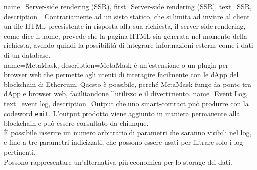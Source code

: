 {
    name={Server-side rendering (SSR)},
    first={Server-side rendering (SSR)},
    text={SSR},
    description={
            Contrariamente ad un sisto statico, che si limita ad inviare al client un file HTML preesistente in risposta alla sua richiesta,
            il server side rendering, come dice il nome, prevede che la pagina HTML sia generata nel momento della richiesta, avendo quindi la possibilità di integrare informazioni esterne come i dati di un database. \\
        }
}
{
    name={MetaMask},
    description={MetaMask è un'estensione o un plugin per browser web che permette agli utenti di interagire facilmente con le dApp del blockchain di Ethereum.
            Questo è possibile, perché MetaMask funge da ponte tra dApp e browser web, facilitandone l'utilizzo e il divertimento.}
}
{
    name={Event Log},
    text={event log},
    description={Output che uno \gls{smart-contract} può produrre con la codeword \texttt{emit}.
            L'output prodotto viene aggiunto in maniera permanente alla blockchain e può essere consultato da chiunque. \\
            È possibile inserire un numero arbitrario di parametri che saranno visibili nel log, e fino a tre parametri indicizzati,
            che possono essere usati per filtrare solo i log pertinenti. \\
            Possono rappresentare un'alternativa più economica per lo storage dei dati.
        }
}
